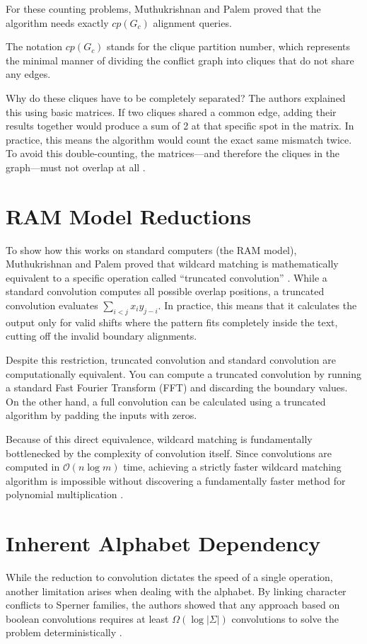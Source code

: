 For these counting problems, Muthukrishnan and Palem proved that the algorithm needs exactly $cp(G_c)$ alignment queries. 

\begin{definition}
The notation $cp(G_c)$ stands for the clique partition number, which represents the minimal manner of dividing the conflict graph into cliques that do not share any edges. 
\end{definition}

Why do these cliques have to be completely separated? The authors explained this using basic matrices. If two cliques shared a common edge, adding their results together would produce a sum of 2 at that specific spot in the matrix. In practice, this means the algorithm would count the exact same mismatch twice. To avoid this double-counting, the matrices—and therefore the cliques in the graph—must not overlap at all \cite{mp1994}.
 
\section{RAM Model Reductions}
To show how this works on standard computers (the RAM model), Muthukrishnan and Palem proved that wildcard matching is mathematically equivalent to a specific operation called ``truncated convolution'' \cite{mp1994}. While a standard convolution computes all possible overlap positions, a truncated convolution evaluates $\sum_{i<j} x_i y_{j-i}$. In practice, this means that it calculates the output only for valid shifts where the pattern fits completely inside the text, cutting off the invalid boundary alignments.

Despite this restriction, truncated convolution and standard convolution are computationally equivalent. You can compute a truncated convolution by running a standard Fast Fourier Transform (FFT) and discarding the boundary values. On the other hand, a full convolution can be calculated using a truncated algorithm by padding the inputs with zeros.

Because of this direct equivalence, wildcard matching is fundamentally bottlenecked by the complexity of convolution itself. Since convolutions are computed in $\mathcal{O}(n \log m)$ time, achieving a strictly faster wildcard matching algorithm is impossible without discovering a fundamentally faster method for polynomial multiplication \cite{mp1994}.

\section{Inherent Alphabet Dependency}
While the reduction to convolution dictates the speed of a single operation, another limitation arises when dealing with the alphabet. By linking character conflicts to Sperner families, the authors showed that any approach based on boolean convolutions requires at least $\Omega(\log |\Sigma|)$ convolutions to solve the problem deterministically \cite{mp1994}.

